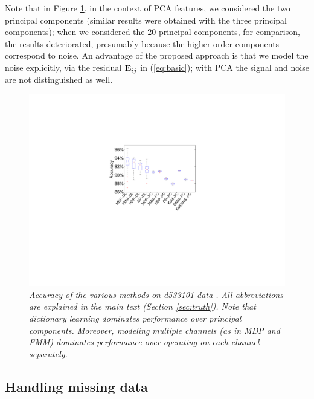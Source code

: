 \documentclass[journal]{IEEEtran}
\begin{document}
Note that in Figure \ref{fig:Accuracy_hc_1}, in the context of PCA features, we considered the two principal components (similar results were obtained with the three principal components); when we considered the 20 principal components, for comparison, the results deteriorated, presumably because the higher-order components correspond to noise. An advantage of the proposed approach is that we model the noise explicitly, via the residual ${\mathbf E}_{ij}$ in (\ref{eq:basic}); with PCA the signal and noise are not distinguished{ as well}. 

\begin{figure}[h!]
  \centering
    \includegraphics[width=1.0\linewidth]{figs_new/Accuracy_hc_1.pdf}
    \caption{\textit{\small{ Accuracy of the various methods on d533101 data \cite{Henze2000}. All abbreviations are explained in the main text (Section \ref{sec:truth}).  Note that dictionary learning dominates performance over principal components.  Moreover, modeling multiple channels (as in MDP and FMM) dominates performance over operating on each channel separately.   
}}}
\label{fig:Accuracy_hc_1}
\end{figure}

\subsection{Handling missing data} \label{sec:missing}
\end{document}
